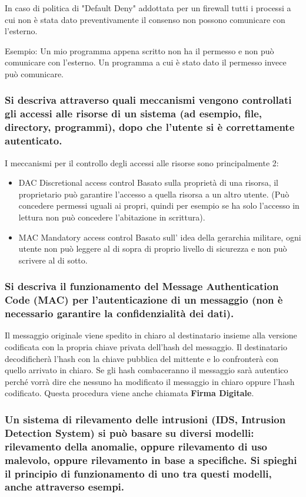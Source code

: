 \documentclass{article}
\begin{document}
In caso di politica di "Default Deny" addottata per un firewall tutti i processi a cui non è stata dato preventivamente il consenso non possono comunicare con l'esterno.

Esempio: Un mio programma appena scritto non ha il permesso e non può comunicare con l'esterno.
Un programma a cui è stato dato il permesso invece può comunicare.

\subsubsection*{
Si descriva attraverso quali meccanismi vengono controllati gli accessi alle risorse di un sistema (ad esempio, file, directory, programmi), dopo che l’utente si è correttamente autenticato.}

I meccanismi per il controllo degli accessi alle risorse sono principalmente 2:
\begin{itemize}
    \item DAC Discretional access control Basato sulla proprietà di una risorsa, il proprietario può garantire l'accesso a quella risorsa a un altro utente. (Può concedere permessi uguali ai propri, quindi per esempio se ha solo l'accesso in lettura non può concedere l'abitazione in scrittura).
    \item MAC Mandatory access control Basato sull' idea della gerarchia militare, ogni utente non può leggere al di sopra di proprio livello di sicurezza e non può scrivere al di sotto.
\end{itemize}


\subsubsection*{Si descriva il funzionamento del Message Authentication Code (MAC) per l’autenticazione di un messaggio (non è necessario garantire la confidenzialità dei dati).}

Il messaggio originale viene spedito in chiaro al destinatario insieme alla versione codificata con la propria chiave privata dell'hash del messaggio. Il destinatario decodificherà l'hash con la chiave pubblica del mittente e lo confronterà con quello arrivato in chiaro.
Se gli hash combaceranno il messaggio sarà autentico perché vorrà dire che nessuno ha modificato il messaggio in chiaro oppure l'hash codificato.
Questa procedura viene anche chiamata \textbf{Firma Digitale}.

\subsubsection*{Un sistema di rilevamento delle intrusioni (IDS, Intrusion Detection System) si può basare su diversi modelli: rilevamento della anomalie, oppure rilevamento di uso malevolo, oppure rilevamento in base a specifiche. Si spieghi il principio di funzionamento di uno tra questi modelli, anche attraverso esempi.}
\end{document}
